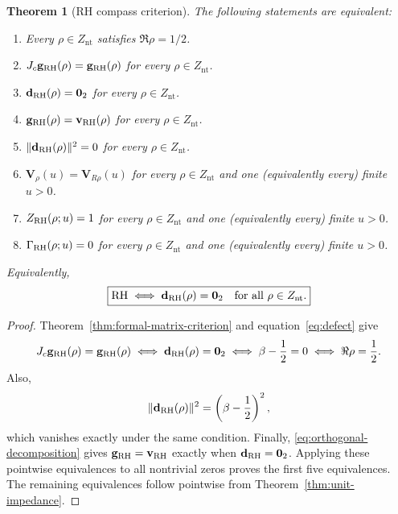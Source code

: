 \documentclass[11pt]{article}
\newtheorem{theorem}[definition]{Theorem}
\newcommand{\Znt}{Z_{\mathrm{nt}}}
\newcommand{\vzero}{\mathbf 0}
\begin{document}
\begin{theorem}[RH compass criterion]\label{thm:criterion}
The following statements are equivalent:
\begin{enumerate}
 \item Every $\rho\in\Znt$ satisfies $\Re\rho=1/2$.
 \item $J_c\mathbf g_{\rm RH}(\rho)=\mathbf g_{\rm RH}(\rho)$ for every
 $\rho\in\Znt$.
 \item $\mathbf d_{\rm RH}(\rho)=\vzero_2$ for every $\rho\in\Znt$.
 \item $\mathbf g_{\rm RH}(\rho)=\mathbf v_{\rm RH}(\rho)$ for every
 $\rho\in\Znt$.
 \item $\|\mathbf d_{\rm RH}(\rho)\|^2=0$ for every $\rho\in\Znt$.
 \item $\mathbf V_\rho(u)=\mathbf V_{R\rho}(u)$ for every $\rho\in\Znt$ and one
 (equivalently every) finite $u>0$.
 \item $Z_{\rm RH}(\rho;u)=1$ for every $\rho\in\Znt$ and one
 (equivalently every) finite $u>0$.
 \item $\Gamma_{\rm RH}(\rho;u)=0$ for every $\rho\in\Znt$ and one
 (equivalently every) finite $u>0$.
\end{enumerate}
Equivalently,
\begin{equation}\label{eq:boxed-criterion}
 \boxed{\mathrm{RH}\iff
 \mathbf d_{\rm RH}(\rho)=\vzero_2\quad\text{for all }\rho\in\Znt.}
\end{equation}
\end{theorem}

\begin{proof}
Theorem~\ref{thm:formal-matrix-criterion} and equation~\eqref{eq:defect} give
\begin{equation}
 J_c\mathbf g_{\rm RH}(\rho)=\mathbf g_{\rm RH}(\rho)
 \iff
 \mathbf d_{\rm RH}(\rho)=\vzero_2
 \iff \beta-\frac12=0
 \iff \Re\rho=\frac12.
\end{equation}
Also,
\begin{equation}
 \|\mathbf d_{\rm RH}(\rho)\|^2
 =\left(\beta-\frac12\right)^2,
\end{equation}
which vanishes exactly under the same condition.  Finally,
\eqref{eq:orthogonal-decomposition} gives
$\mathbf g_{\rm RH}=\mathbf v_{\rm RH}$ exactly when
$\mathbf d_{\rm RH}=\vzero_2$.  Applying these pointwise equivalences to all nontrivial
zeros proves the first five equivalences.  The remaining equivalences follow pointwise from
Theorem~\ref{thm:unit-impedance}.
\end{proof}
\end{document}
